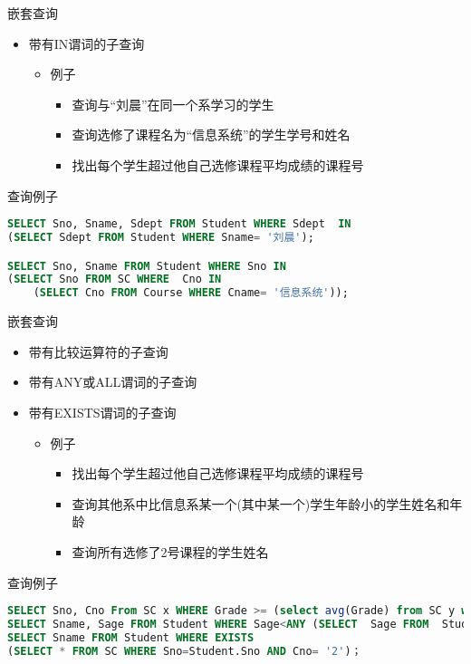 \begin{frame}[fragile]{嵌套查询}
\begin{itemize}
    \item  带有IN谓词的子查询
    \begin{itemize}
        \item 例子
        \begin{itemize}
            \item 查询与“刘晨”在同一个系学习的学生
            \item 查询选修了课程名为“信息系统”的学生学号和姓名
            \item 找出每个学生超过他自己选修课程平均成绩的课程号
        \end{itemize}

    \end{itemize}
\end{itemize}
\begin{block}{查询例子}
\begin{lstlisting}[language=SQL]
SELECT Sno, Sname, Sdept FROM Student WHERE Sdept  IN
(SELECT Sdept FROM Student WHERE Sname= '刘晨');

SELECT Sno, Sname FROM Student WHERE Sno IN
(SELECT Sno FROM SC WHERE  Cno IN 
    (SELECT Cno FROM Course WHERE Cname= '信息系统'));

\end{lstlisting}
\end{block}
\end{frame}

\begin{frame}[fragile]{嵌套查询}
\begin{itemize}
    \item 带有比较运算符的子查询
    \item 带有ANY或ALL谓词的子查询
    \item 带有EXISTS谓词的子查询
    \begin{itemize}
        \item 例子
        \begin{itemize}
            \item 找出每个学生超过他自己选修课程平均成绩的课程号
            \item 查询其他系中比信息系某一个(其中某一个)学生年龄小的学生姓名和年龄
            \item 查询所有选修了2号课程的学生姓名
        \end{itemize}

    \end{itemize}
\end{itemize}
\begin{block}{查询例子}
\begin{lstlisting}[language=SQL]
SELECT Sno, Cno From SC x WHERE Grade >= (select avg(Grade) from SC y where y.Sno=x.Sno);
SELECT Sname, Sage FROM Student WHERE Sage<ANY (SELECT  Sage FROM  Student  WHERE Sdept='IS') AND Sdept != 'IS' ;  
SELECT Sname FROM Student WHERE EXISTS 
(SELECT * FROM SC WHERE Sno=Student.Sno AND Cno= '2')；

\end{lstlisting}
\end{block}
\end{frame}


